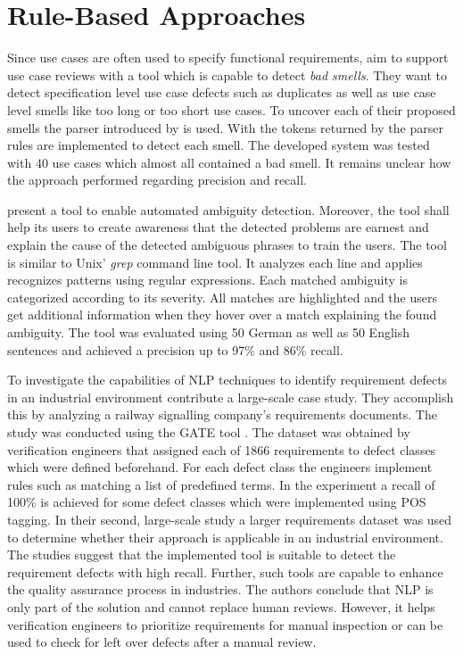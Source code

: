 \section{Rule-Based Approaches}
\label{chp:related_research:sec:rule_based approaches}

Since use cases are often used to specify functional requirements, \textcite{Ciemniewska:2007} aim to support use case reviews with a tool which is capable to detect \textit{bad smells}.
They want to detect specification level use case defects such as duplicates as well as use case level smells like too long or too short use cases.
To uncover each of their proposed smells the parser introduced by \textcite{Klein:2002} is used.
With the tokens returned by the parser rules are implemented to detect each smell.
The developed system was tested with 40 use cases which almost all contained a bad smell.
It remains unclear how the approach performed regarding precision and recall.

\textcite{Gleich:2010} present a tool to enable automated ambiguity detection.
Moreover, the tool shall help its users to create awareness that the detected problems are earnest and explain the cause of the detected ambiguous phrases to train the users.
The tool is similar to Unix' \textit{grep} command line tool.
It analyzes each line and applies recognizes patterns using regular expressions.
Each matched ambiguity is categorized according to its severity.
All matches are highlighted and the users get additional information when they hover over a match explaining the found ambiguity.
The tool was evaluated using 50 German as well as 50 English sentences and achieved a precision up to 97\% and 86\% recall.

To investigate the capabilities of \ac{NLP} techniques to identify requirement defects in an industrial environment \textcite{Rosadini:2017} contribute a large-scale case study.
They accomplish this by analyzing a railway signalling company's requirements documents.
The study was conducted using the \ac{GATE} tool \parencite{Cunningham:2002}.
The dataset was obtained by verification engineers that assigned each of 1866 requirements to defect classes which were defined beforehand.
For each defect class the engineers implement rules such as matching a list of predefined terms.
In the experiment a recall of 100\% is achieved for some defect classes which were implemented using \ac{POS} tagging.
In their second, large-scale study a larger requirements dataset was used to determine whether their approach is applicable in an industrial environment.
The studies suggest that the implemented tool is suitable to detect the requirement defects with high recall.
Further, such tools are capable to enhance the quality assurance process in industries.
The authors conclude that \ac{NLP} is only part of the solution and cannot replace human reviews.
However, it helps verification engineers to prioritize requirements for manual inspection or can be used to check for left over defects after a manual review.

